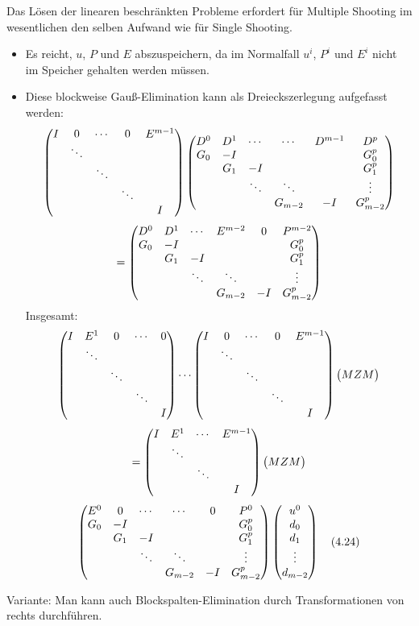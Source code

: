 
Das Lösen der linearen beschränkten Probleme erfordert für Multiple Shooting im wesentlichen den selben Aufwand wie für Single Shooting.


\begin{itemize}
\item Es reicht, $u$, $P$ und $E$ abszuspeichern, da im Normalfall $u^i$, $P^i$ und $E^i$ nicht im Speicher gehalten werden müssen.
\item Diese blockweise Gauß-Elimination kann als Dreieckszerlegung aufgefasst werden:
\[ \begin{pmatrix} I & 0 & \cdots & 0 & E^{m-1} \\ & \ddots \\ & & \ddots \\ & & & \ddots \\ &&&&  I \end{pmatrix} \begin{pmatrix} D^0 & D^1 & \cdots & \cdots & D^{m-1} & D^p \\ G_0 & -I & && & G_0^p \\ & G_1 & -I & && G_1^p \\ & & \ddots & \ddots & & \vdots \\ & & & G_{m-2} & -I & G_{m-2}^p  \end{pmatrix} \]
\[ = \begin{pmatrix} D^0 & D^1 & \cdots & E^{m-2} & 0 & P^{m-2} \\ G_0 & -I & && & G_0^p \\ & G_1 & -I & && G_1^p \\ & & \ddots & \ddots & & \vdots \\ & & & G_{m-2} & -I & G_{m-2}^p \end{pmatrix} \]
Insgesamt:
\[ \begin{pmatrix} I & E^1 & 0 & \cdots & 0 \\ & \ddots \\ & & \ddots \\ & & & \ddots \\ &&&&  I \end{pmatrix} \cdots \begin{pmatrix} I & 0 & \cdots & 0 & E^{m-1} \\ & \ddots \\ & & \ddots \\ & & & \ddots \\ &&&&  I \end{pmatrix} \begin{pmatrix} MZM \end{pmatrix} \]
\[ = \begin{pmatrix} I & E^1 & \cdots & E^{m-1} \\ & \ddots \\ & & \ddots \\ &&&  I \end{pmatrix} \begin{pmatrix} MZM \end{pmatrix} \]
\[ \begin{pmatrix} E^0 & 0 & \cdots & \cdots & 0 & P^0 \\ G_0 & -I & && & G_0^p \\ & G_1 & -I & && G_1^p \\ & & \ddots & \ddots & & \vdots \\ & & & G_{m-2} & -I & G_{m-2}^p  \end{pmatrix} \begin{pmatrix} u^0 \\ d_0 \\ d_1 \\ \vdots \\ d_{m-2} \end{pmatrix} \quad (4.24) \]
\end{itemize}

Variante: Man kann auch Blockspalten-Elimination durch Transformationen von rechts durchführen.
















